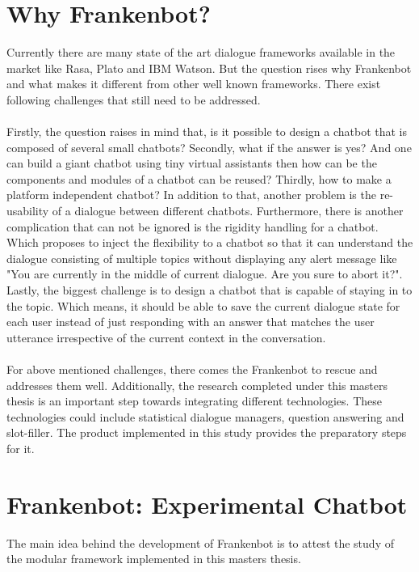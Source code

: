 \section{Why Frankenbot?}
Currently there are many state of the art dialogue frameworks available in the market like Rasa, Plato and IBM Watson. But the question rises why Frankenbot and what makes it different from other well known frameworks. There exist following challenges that still need to be addressed.
\\~\\
Firstly, the question raises in mind that, is it possible to design a chatbot that is composed of several small chatbots? Secondly, what if the answer is yes? And one can build a giant chatbot using tiny virtual assistants then how can be the components and modules of a chatbot can be reused? Thirdly, how to make a platform independent chatbot? In addition to that, another problem is the re-usability of a dialogue between different chatbots. Furthermore, there is another complication that can not be ignored is the rigidity handling for a chatbot. Which proposes to inject the flexibility to a chatbot so that it can understand the dialogue consisting of multiple topics without displaying any alert message like "You are currently in the middle of current dialogue. Are you sure to abort it?". Lastly, the biggest challenge is to design a chatbot that is capable of staying in to the topic. Which means, it should be able to save the current dialogue state for each user instead of just responding with an answer that matches the user utterance irrespective of the current context in the conversation. 
\\~\\
For above mentioned challenges, there comes the Frankenbot to rescue and addresses them well. Additionally, the research completed under this masters thesis is an important step towards integrating different technologies. These technologies could include statistical dialogue managers, question answering and slot-filler. The product implemented in this study provides the preparatory steps for it.

\section{Frankenbot: Experimental Chatbot}
The main idea behind the development of Frankenbot is to attest the study of the modular framework implemented in this masters thesis. 

